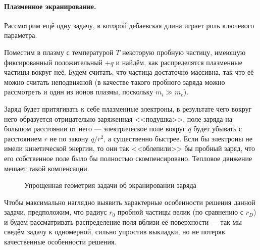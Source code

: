 \paragraph{Плазменное экранирование.}
Рассмотрим ещё одну задачу, в которой дебаевская длина играет роль
ключевого параметра.

Поместим в плазму с температурой $T$ некоторую пробную частицу, имеющую фиксированный
положительный $+q$ и найдём, как распределятся плазменные частицы вокруг неё.
Будем считать, что частица достаточно массивна, так что её можно
считать неподвижной (в качестве такого пробного заряда можно рассмотреть
и один из ионов плазмы, поскольку $m_i \gg m_e$).

Заряд будет притягивать к себе плазменные электроны, в результате чего
вокруг него образуется отрицательно заряженная <<подушка>>,
 поле заряда на большом расстоянии от него ---
электрическое поле вокруг $q$ будет убывать с расстоянием $r$
не по закону $q/r^2$, а существенно быстрее.
Если бы электроны не имели кинетической энергии, то они так <<облепили>>
бы пробный заряд, что его собственное поле было бы полностью скомпенсировано.
Тепловое движение мешает такой компенсации.

\begin{wrapfigure}{o}{0.3\textwidth}
    \centering
    \caption{Упрощенная геометрия задачи об экранировании заряда}
\end{wrapfigure}

Чтобы максимально наглядно выявить характерные особенности решения данной задачи,
предположим, что радиус $r_0$ пробной частицы велик (по сравнению с $r_D$)
и будем рассматривать распределение поля вблизи её поверхности ---
так мы сведём задачу к одномерной, сильно упростив выкладки, но не потеряв
качественные особенности решения.


